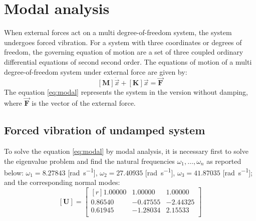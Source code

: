 \chapter{Modal analysis}\label{chap:modalanalysis}
When external forces act on a multi degree-of-freedom system, the system
undergoes forced vibration.
For a system with three coordinates or degrees of freedom, the governing
equation of motion are a set of three coupled ordinary differential equations of
second second order.
The equations of motion of a multi degree-of-freedom system under external force
are given by:
\begin{equation}
  \label{eq:modal}
  [\mathbf{M}] \ddot{\vec{x}} + [\mathbf{K}] \vec{x} = \vec{\mathbf{F}}
\end{equation}
The equation \eqref{eq:modal} represents the system in the version without
damping, where \(\vec{\mathbf{F}}\) is the vector of the external force.
\section{Forced vibration of undamped system}\label{sec:eigen}
To solve the equation \eqref{eq:modal} by modal analysis, it is necessary first
to solve the eigenvalue problem and find the natural frequencies \(\omega_1,
\dots, \omega_n\) as reported below:
\(\omega_{1} = 8.27843\) [\si{\radian\per\second}],
\(\omega_{2} = 27.40935\) [\si{\radian\per\second}],
\(\omega_{3} = 41.87035\) [\si{\radian\per\second}];
and the corresponding normal modes:
\begin{equation}
	\label{eq:eiegnmodefree}
 	[\mathbf{U}] = \begin{bmatrix*}[r]
 		1.00000 & 1.00000 & 1.00000 \\
		0.86540 &-0.47555 &-2.44325 \\
		0.61945 &-1.28034 & 2.15533 \\
 	\end{bmatrix*}
\end{equation}
